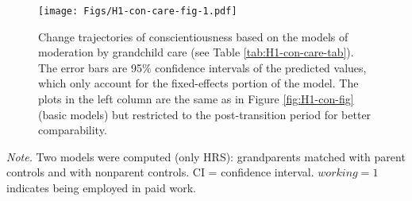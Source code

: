 \documentclass[
  english,
  man, noextraspace,floatsintext]{apa7}
\newenvironment{lltable}{\begin{landscape}\begin{center}\begin{ThreePartTable}}{\end{ThreePartTable}\end{center}\end{landscape}}
\begin{document}
\begin{figure}
\centering
\texttt{[image: Figs/H1-con-care-fig-1.pdf]}
\caption{\label{fig:H1-con-care-fig}Change trajectories of conscientiousness based on the models of moderation by grandchild care (see Table \ref{tab:H1-con-care-tab}). The error bars are 95\% confidence intervals of the predicted values, which only account for the fixed-effects portion of the model. The plots in the left column are the same as in Figure \ref{fig:H1-con-fig} (basic models) but restricted to the post-transition period for better comparability.}
\end{figure}




\begin{lltable}

\begin{TableNotes}[para]
\normalsize{\textit{Note.} Two models were computed (only HRS): grandparents matched with parent controls and with nonparent controls. CI = confidence interval. \(working=1\) indicates being employed in paid work.}
\end{TableNotes}

\footnotesize{

}
\end{lltable}
\end{document}
